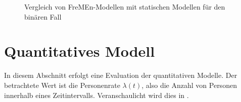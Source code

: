 \begin{figure}[!h]
	\centering

	\caption{Vergleich von FreMEn-Modellen mit statischen Modellen für den binären Fall}
	\label{fig.binary_fremen_vs_static}
\end{figure}



\newpage
\section{Quantitatives Modell}
\label{sec.Quantitatives Modell}

In diesem Abschnitt erfolgt eine Evaluation der quantitativen Modelle. Der betrachtete Wert ist die Personenrate $\lambda(t)$, also die Anzahl von Personen innerhalb eines Zeitintervalls. Veranschaulicht wird dies in .

